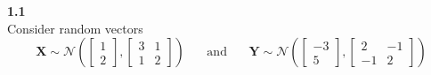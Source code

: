 \documentclass[12pt,a4paper]{report}
\author{Frederik Appel Vardinghus-Nielsen}
\begin{document}
\noindent\textbf{1.1}\\
Consider random vectors
\begin{equation}
\mathbf{X}\sim\mathcal{N}\left(\begin{bmatrix}1\\2\end{bmatrix},\begin{bmatrix}3&1\\1&2\end{bmatrix}\right)\phantom{mm}\text{and}\phantom{mm}\mathbf{Y}\sim\mathcal{N}\left(\begin{bmatrix}-3\\5\end{bmatrix},\begin{bmatrix}2&-1\\-1&2\end{bmatrix}\right)
\end{equation}
\end{document}

